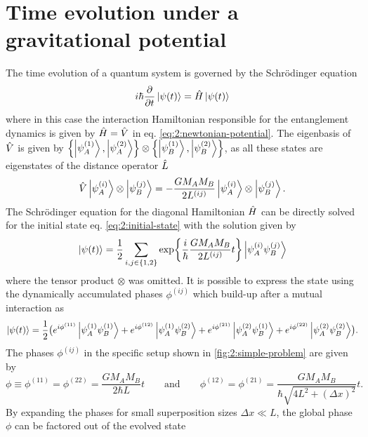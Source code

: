 \section{Time evolution under a gravitational potential}\label{sec:2:time-evolution}

The time evolution of a quantum system is governed by the Schrödinger equation
\begin{equation}
  i\hbar \pdv{t} \ket{\psi(t)} = \hat{H} \ket{\psi(t)}
\end{equation}
where in this case the interaction Hamiltonian responsible for the entanglement dynamics is given by $\hat{H} = \hat{V}$ in eq. \eqref{eq:2:newtonian-potential}.
The eigenbasis of $\hat{V}$ is given by $\left\{ \ket{\psi_A^{(1)}}, \ket{\psi_A^{(2)}} \right\}\otimes \left\{ \ket{\psi_B^{(1)}}, \ket{\psi_B^{(2)}} \right\}$, as all these states are eigenstates of the distance operator $\hat{L}$
\begin{equation}
  \hat{V} \ket{\psi^{(i)}_A} \otimes \ket{\psi^{(j)}_B} = -\frac{G M_A M_B}{2L^{(ij)}} \ket{\psi^{(i)}_A} \otimes \ket{\psi^{(j)}_B} .
\end{equation}
The Schrödinger equation for the diagonal Hamiltonian $\hat{H}$ can be directly solved for the initial state eq. \eqref{eq:2:initial-state} with the solution given by 
\begin{equation}
  \ket{\psi(t)} = \frac{1}{2} \sum_{i,j\in\{1,2\}} \exp{\frac{i}{\hbar} \frac{G M_A M_B}{2L^{(ij)}} t} \ket{\psi^{(i)}_A \psi^{(j)}_B}
\end{equation}
where the tensor product $\otimes$ was omitted.
It is possible to express the state using the dynamically accumulated phases $\phi^{(ij)}$ which build-up after a mutual interaction as
\begin{equation}\label{eq:2:evolved-state}
  \ket{\psi(t)} = \frac{1}{2}\bigl(
    e^{i\phi^{(11)}} \ket{\psi_A^{(1)} \psi_B^{(1)}} 
    + e^{i\phi^{(12)}} \ket{\psi_A^{(1)} \psi_B^{(2)}}
    + e^{i\phi^{(21)}} \ket{\psi_A^{(2)} \psi_B^{(1)}} 
    + e^{i\phi^{(22)}} \ket{\psi_A^{(2)} \psi_B^{(2)}} \bigr) .
\end{equation}
The phases $\phi^{(ij)}$ in the specific setup shown in \cref{fig:2:simple-problem} are given by
\begin{equation}
  \phi \equiv \phi^{(11)} = \phi^{(22)} = \frac{G M_A M_B}{2\hbar L}t 
  \qquad \text{and} \qquad 
  \phi^{(12)} = \phi^{(21)} = \frac{G M_A M_B}{\hbar \sqrt{4L^2 + (\Delta x)^2}}t .
\end{equation}
By expanding the phases for small superposition sizes $\Delta x \ll L$, the global phase $\phi$ can be factored out of the evolved state
